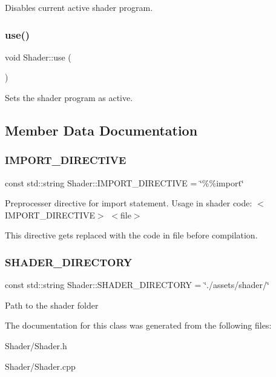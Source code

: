 Disables current active shader program. \mbox{\label{class_shader_a870fa9f13d69e558815d6fd351a469dc}} 
\subsubsection{\texorpdfstring{use()}{use()}}
{\footnotesize\ttfamily void Shader\+::use (\begin{DoxyParamCaption}{ }\end{DoxyParamCaption})}

Sets the shader program as active. 

\subsection{Member Data Documentation}
\mbox{\label{class_shader_aa6e44073d2057294985c44d4026bfe76}} 
\subsubsection{\texorpdfstring{IMPORT\_DIRECTIVE}{IMPORT\_DIRECTIVE}}
{\footnotesize\ttfamily const std\+::string Shader\+::\+I\+M\+P\+O\+R\+T\+\_\+\+D\+I\+R\+E\+C\+T\+I\+VE = \char`\"{}\%\%import\char`\"{}\hspace{0.3cm}{\ttfamily [static]}}

Preprocesser directive for import statement. Usage in shader code\+: $<$\+I\+M\+P\+O\+R\+T\+\_\+\+D\+I\+R\+E\+C\+T\+I\+V\+E$>$ $<$file$>$

This directive gets replaced with the code in file before compilation. \mbox{\label{class_shader_aa455d9f9902f2c9ac34fb6a3103b86d1}} 
\subsubsection{\texorpdfstring{SHADER\_DIRECTORY}{SHADER\_DIRECTORY}}
{\footnotesize\ttfamily const std\+::string Shader\+::\+S\+H\+A\+D\+E\+R\+\_\+\+D\+I\+R\+E\+C\+T\+O\+RY = \char`\"{}./assets/shader/\char`\"{}\hspace{0.3cm}{\ttfamily [static]}}

Path to the shader folder 

The documentation for this class was generated from the following files\+:\begin{DoxyCompactItemize}
\item 
Shader/Shader.\+h\item 
Shader/Shader.\+cpp\end{DoxyCompactItemize}
